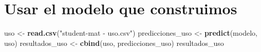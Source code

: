 \documentclass[
]{article}
\newenvironment{Shaded}{\begin{snugshade}}{\end{snugshade}}
\newcommand{\KeywordTok}[1]{\textcolor[rgb]{0.13,0.29,0.53}{\textbf{#1}}}
\newcommand{\NormalTok}[1]{#1}
\newcommand{\StringTok}[1]{\textcolor[rgb]{0.31,0.60,0.02}{#1}}
\begin{document}
\hypertarget{usar-el-modelo-que-construimos}{%
\section{Usar el modelo que
construimos}\label{usar-el-modelo-que-construimos}}

\begin{Shaded}
\begin{Highlighting}[]
\NormalTok{uso <-}\StringTok{ }\KeywordTok{read.csv}\NormalTok{(}\StringTok{"student-mat - uso.csv"}\NormalTok{)}
\NormalTok{predicciones_uso <-}\StringTok{ }\KeywordTok{predict}\NormalTok{(modelo, uso)}
\NormalTok{resultados_uso <-}\StringTok{ }\KeywordTok{cbind}\NormalTok{(uso, predicciones_uso)}
\NormalTok{resultados_uso}
\end{Highlighting}
\end{Shaded}
\end{document}
